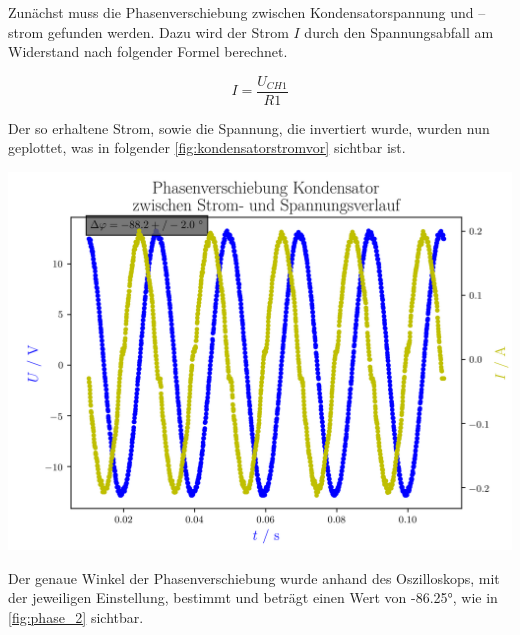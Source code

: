 \documentclass[11pt,ngerman]{scrartcl}
\begin{document}
Zunächst muss die Phasenverschiebung zwischen Kondensatorspannung und –strom gefunden werden.
Dazu wird der Strom $I$ durch den Spannungsabfall am Widerstand nach folgender Formel berechnet.

\begin{equation}
	I = \frac{U_{CH1}}{R1}
	\label{eq:i}
\end{equation}

Der so erhaltene Strom, sowie die Spannung, die invertiert wurde, wurden nun geplottet, was in folgender \autoref{fig:kondensatorstromvor} sichtbar ist.

\begin{center}
	\begin{minipage}[t]{0.8\textwidth}
		\includegraphics[width=\textwidth]{./figures/phaseleistung/Versuch2/phaseshiftcap.png}
		\label{fig:kondensatorstromvor}
	\end{minipage}
\end{center}

Der genaue Winkel der Phasenverschiebung wurde anhand des Oszilloskops, mit der
jeweiligen Einstellung, bestimmt und beträgt einen Wert von -86.25°, wie in
\autoref{fig:phase_2} sichtbar.
\end{document}
